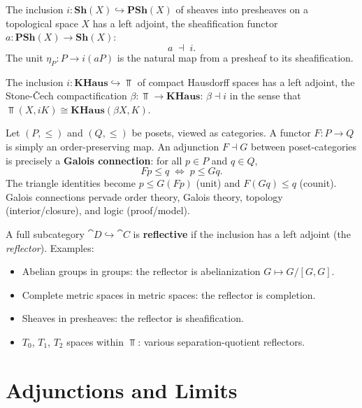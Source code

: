 \begin{example}[Sheafification]
The inclusion $i: \mathbf{Sh}(X) \hookrightarrow \mathbf{PSh}(X)$ of sheaves into presheaves on a topological space $X$ has a left adjoint, the sheafification functor $a: \mathbf{PSh}(X) \to \mathbf{Sh}(X)$:
\[
  a \;\dashv\; i.
\]
The unit $\eta_P: P \to i(aP)$ is the natural map from a presheaf to its sheafification.
\end{example}

\begin{example}
The inclusion $i: \mathbf{KHaus} \hookrightarrow \Top$ of compact Hausdorff spaces has a left adjoint, the Stone-Čech compactification $\beta: \Top \to \mathbf{KHaus}$: $\beta \dashv i$ in the sense that $\Top(X, iK) \cong \mathbf{KHaus}(\beta X, K)$.
\end{example}

\begin{example}
Let $(P, \leq)$ and $(Q, \leq)$ be posets, viewed as categories. A functor $F: P \to Q$ is simply an order-preserving map. An adjunction $F \dashv G$ between poset-categories is precisely a \textbf{Galois connection}: for all $p \in P$ and $q \in Q$,
\[
  Fp \leq q \;\iff\; p \leq Gq.
\]
The triangle identities become $p \leq G(Fp)$ (unit) and $F(Gq) \leq q$ (counit). Galois connections pervade order theory, Galois theory, topology (interior/closure), and logic (proof/model).
\end{example}

\begin{example}
A full subcategory $\cat{D} \hookrightarrow \cat{C}$ is \textbf{reflective} if the inclusion has a left adjoint (the \emph{reflector}). Examples:
\begin{itemize}
  \item Abelian groups in groups: the reflector is abelianization $G \mapsto G/[G,G]$.
  \item Complete metric spaces in metric spaces: the reflector is completion.
  \item Sheaves in presheaves: the reflector is sheafification.
  \item $T_0$, $T_1$, $T_2$ spaces within $\Top$: various separation-quotient reflectors.
\end{itemize}
\end{example}

\section{Adjunctions and Limits}


